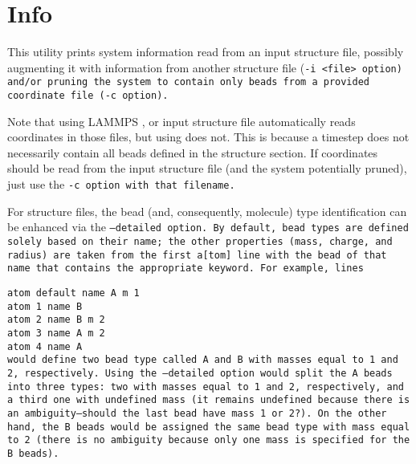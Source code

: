 \section{Info}\label{sec:Info}

This utility prints system information read from an input structure file,
possibly augmenting it with information from another structure file (\tt{-i
<file>} option) and/or pruning the system to contain only beads from a provided
coordinate file (\tt{-c} option).

Note that using LAMMPS \data, \ltrj or \xyz input structure file automatically
reads coordinates in those files, but using \vtf does not. This is because a
\vtf timestep does not necessarily contain all beads defined in the \vtf
structure section. If coordinates should be read from the input \vtf structure
file (and the system potentially pruned), just use the \tt{-c} option with that
filename.

For \vtf structure files, the bead (and, consequently, molecule) type
identification can be enhanced via the \tt{--detailed} option. By default, bead
types are defined solely based on their name; the other properties (mass,
charge, and radius) are taken from the first \tt{a[tom]} line with the bead of
that name that contains the appropriate keyword. For example, lines

\noindent
\tt{atom default name A m 1}\\
\tt{atom 1 name B}\\
\tt{atom 2 name B m 2}\\
\tt{atom 3 name A m 2}\\
\tt{atom 4 name A}\\[-1em]

\noindent
would define two bead type called \tt{A} and \tt{B} with masses equal to 1 and
2, respectively. Using the \tt{--detailed} option would split the \tt{A} beads
into three types: two with masses equal to 1 and 2, respectively, and a third
one with undefined mass (it remains undefined because there is an
ambiguity---should the last bead have mass 1 or 2?).
On the other hand, the \tt{B} beads would be assigned the same bead type with
mass equal to 2 (there is no ambiguity because only one mass is specified for
the \tt{B} beads).

